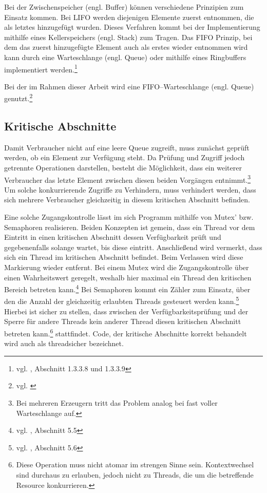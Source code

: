 Bei der Zwischenspeicher (engl. Buffer) können verschiedene Prinzipien zum Einsatz kommen. Bei \ac{LIFO} werden diejenigen Elemente zuerst entnommen, die als letztes hinzugefügt wurden. Dieses Verfahren kommt bei der Implementierung mithilfe eines Kellerspeichers (engl. Stack) zum Tragen.  Das \ac{FIFO} Prinzip, bei dem das zuerst hinzugefügte Element auch als erstes wieder entnommen wird kann durch eine Warteschlange (engl. Queue) oder mithilfe eines Ringbuffers implementiert werden.\footnote{vgl. \cite{algorithms}, Abschnitt 1.3.3.8 und 1.3.3.9}

Bei der im Rahmen dieser Arbeit wird eine FIFO–Warteschlange (engl. Queue) genutzt.\footnote{vgl. \cite{javadoc:lbq}}


\subsection{Kritische Abschnitte} %
\label{sub:kritische_abschnitte}

Damit Verbraucher nicht auf eine leere Queue zugreift, muss zunächst geprüft werden, ob ein Element zur Verfügung steht. Da Prüfung und Zugriff jedoch getrennte Operationen darstellen, besteht die Möglichkeit, dass ein weiterer Verbraucher das letzte Element zwischen diesen beiden Vorgängen entnimmt.\footnote{Bei mehreren Erzeugern tritt das Problem analog bei fast voller Warteschlange auf.} Um solche konkurrierende Zugriffe zu Verhindern, muss verhindert werden, dass sich mehrere Verbraucher gleichzeitig in diesem kritischen Abschnitt befinden.

Eine solche Zugangskontrolle lässt im sich Programm mithilfe von Mutex' bzw. Semaphoren realisieren. Beiden Konzepten ist gemein, dass ein Thread vor dem Eintritt in einen kritischen Abschnitt dessen Verfügbarkeit prüft und gegebenenfalls solange wartet, bis diese eintritt. Anschließend wird vermerkt, dass sich ein Thread im kritischen Abschnitt befindet. Beim Verlassen wird diese Markierung wieder entfernt. Bei einem Mutex wird die Zugangskontrolle über einen Wahrheitswert geregelt, weshalb hier maximal ein Thread den kritischen Bereich betreten kann.\footnote{vgl. \cite{oscon}, Abschnitt 5.5} Bei Semaphoren kommt ein Zähler zum Einsatz, über den die Anzahl der gleichzeitig erlaubten Threads gesteuert werden kann.\footnote{vgl. \cite{oscon}, Abschnitt 5.6} Hierbei ist sicher zu stellen, dass zwischen der Verfügbarkeitsprüfung und der Sperre für andere Threads kein anderer Thread diesen kritischen Abschnitt betreten kann.\footnote{Diese Operation muss nicht atomar im strengen Sinne sein. Kontextwechsel sind durchaus zu erlauben, jedoch nicht zu Threads, die um die betreffende Resource konkurrieren.} stattfindet. Code, der kritische Abschnitte korrekt behandelt wird auch als threadsicher bezeichnet.

